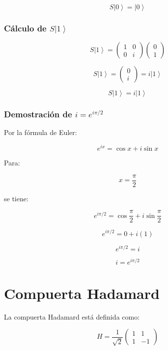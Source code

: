 \documentclass[12pt,a4paper]{article}
\newcommand{\ket}[1]{\left|#1\right\rangle}
\begin{document}
\begin{resultado}
\[
\boxed{S\ket{0}=\ket{0}}
\]
\end{resultado}

\subsubsection*{Cálculo de \texorpdfstring{$S\ket{1}$}{S ket 1}}

\[
S\ket{1}
=
\begin{pmatrix}
1 & 0\\
0 & i
\end{pmatrix}
\begin{pmatrix}
0\\
1
\end{pmatrix}
\]

\[
S\ket{1}
=
\begin{pmatrix}
0\\
i
\end{pmatrix}
=
i\ket{1}
\]

\begin{resultado}
\[
\boxed{S\ket{1}=i\ket{1}}
\]
\end{resultado}

\subsubsection*{Demostración de \texorpdfstring{$i=e^{i\pi/2}$}{i=e^ipi/2}}

Por la fórmula de Euler:

\[
e^{ix}=\cos x+i\sin x
\]

Para:

\[
x=\frac{\pi}{2}
\]

se tiene:

\[
e^{i\pi/2}
=
\cos\frac{\pi}{2}
+
i\sin\frac{\pi}{2}
\]

\[
e^{i\pi/2}=0+i(1)
\]

\[
e^{i\pi/2}=i
\]

\begin{resultado}
\[
\boxed{i=e^{i\pi/2}}
\]
\end{resultado}

\section{Compuerta Hadamard}

La compuerta Hadamard está definida como:

\[
H=
\frac{1}{\sqrt{2}}
\begin{pmatrix}
1 & 1\\
1 & -1
\end{pmatrix}
\]
\end{document}
